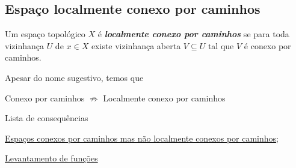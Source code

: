 \subsection{Espaço localmente conexo por caminhos}
\label{localmente-conexo-por-caminhos-def}
\begin{defi}
	Um espaço topológico $X$ é \textit{\textbf{localmente conexo por caminhos}} se para toda vizinhança $U$ de $x \in X$ existe vizinhança aberta $V \subseteq U$ tal que $V$ é conexo por caminhos.
\end{defi}

Apesar do nome sugestivo, temos que
\begin{center}
Conexo por caminhos $\nRightarrow$ Localmente conexo por caminhos
\end{center}

\begin{titlemize}{Lista de consequências}
	\item \hyperref[localmente-conexo-por-caminhos-ex]{Espaços conexos por caminhos mas não localmente conexos por caminhos};\\ %
	\item \hyperref[levantamento-de-funções-prop]{Levantamento de funções}
\end{titlemize}

